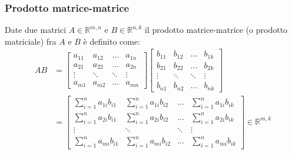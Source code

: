 \subsubsection{Prodotto matrice-matrice} \label{subsec:matmul}
    Date due matrici $A \in \mathbb{R}^{m, n}$ e $B \in \mathbb{R}^{n, k}$ il prodotto matrice-matrice (o prodotto matriciale) fra $A$ e $B$ è definito come:
    \[
        \begin{aligned}
        AB
        &=
        \begin{bmatrix}
            a_{11} & a_{12} & ... & a_{1n} \\
            a_{21} & a_{22} & ... & a_{2n} \\
            \vdots & \ddots & \ddots & \vdots \\
            a_{m1} & a_{m2} & ... & a_{mn}
        \end{bmatrix}
        \begin{bmatrix}
            b_{11} & b_{12} & ... & b_{1k} \\
            b_{21} & b_{22} & ... & b_{2k} \\
            \vdots & \ddots & \ddots & \vdots \\
            b_{n1} & b_{n2} & ... & b_{nk}
        \end{bmatrix}
        \\
        &=
        \begin{bmatrix}
            \displaystyle\sum_{i = 1}^{n}{a_{1i} b_{i1}} & \displaystyle\sum_{i = 1}^{n}{a_{1i} b_{i2}} & ... & \displaystyle\sum_{i = 1}^{n}{a_{1i} b_{ik}} \\
            \displaystyle\sum_{i = 1}^{n}{a_{2i} b_{i1}} & \displaystyle\sum_{i = 1}^{n}{a_{2i} b_{i2}} & ... & \displaystyle\sum_{i = 1}^{n}{a_{2i} b_{ik}} \\
            \vdots & \ddots & \ddots & \vdots \\
            \displaystyle\sum_{i = 1}^{n}{a_{mi} b_{i1}} & \displaystyle\sum_{i = 1}^{n}{a_{mi} b_{i2}} & ... & \displaystyle\sum_{i = 1}^{n}{a_{mi} b_{ik}}
        \end{bmatrix}
        \in \mathbb{R}^{m, k}
        \end{aligned}
    \]

